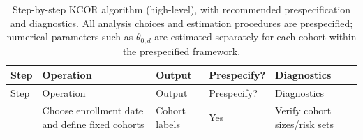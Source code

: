 \documentclass[
]{article}
\begin{document}
\begin{longtable}[]{@{}
  >{\raggedright\arraybackslash}p{}
  >{\raggedright\arraybackslash}p{}
  >{\raggedright\arraybackslash}p{}
  >{\raggedright\arraybackslash}p{}
  >{\raggedright\arraybackslash}p{}@{}}
\caption{Step-by-step KCOR algorithm (high-level), with recommended
prespecification and diagnostics. All analysis choices and estimation
procedures are prespecified; numerical parameters such as
\(\theta_{0,d}\) are estimated separately for each cohort within the
prespecified framework.}\label{tbl:KCOR_algorithm}\tabularnewline
\toprule\noalign{}
\begin{minipage}[b]{\linewidth}\raggedright
Step
\end{minipage} & \begin{minipage}[b]{\linewidth}\raggedright
Operation
\end{minipage} & \begin{minipage}[b]{\linewidth}\raggedright
Output
\end{minipage} & \begin{minipage}[b]{\linewidth}\raggedright
Prespecify?
\end{minipage} & \begin{minipage}[b]{\linewidth}\raggedright
Diagnostics
\end{minipage} \\
\midrule\noalign{}
\endfirsthead
\toprule\noalign{}
\begin{minipage}[b]{\linewidth}\raggedright
Step
\end{minipage} & \begin{minipage}[b]{\linewidth}\raggedright
Operation
\end{minipage} & \begin{minipage}[b]{\linewidth}\raggedright
Output
\end{minipage} & \begin{minipage}[b]{\linewidth}\raggedright
Prespecify?
\end{minipage} & \begin{minipage}[b]{\linewidth}\raggedright
Diagnostics
\end{minipage} \\
\midrule\noalign{}
\endhead
\bottomrule\noalign{}
\endlastfoot
1 & Choose enrollment date and define fixed cohorts & Cohort labels &
Yes & Verify cohort sizes/risk sets \\

\end{longtable}
\end{document}

